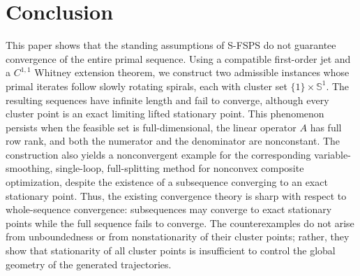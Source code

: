 \documentclass[11pt]{article}
\numberwithin{equation}{section}
\begin{document}
\section{Conclusion}\label{sec:conclusion}


This paper shows that the standing assumptions of S-FSPS do not
guarantee convergence of the entire primal sequence. Using a
compatible first-order jet and a $C^{1,1}$ Whitney extension theorem,
we construct two admissible instances whose primal iterates follow
slowly rotating spirals, each with cluster set
$\{1\}\times\mathbb S^1$. The resulting sequences have infinite
length and fail to converge, although every cluster point is an exact
limiting lifted stationary point.  This phenomenon persists when the feasible set is
full-dimensional, the linear operator  $A$ has full row rank,
and both the numerator and the denominator are nonconstant. The construction
also yields a nonconvergent example for the corresponding variable-smoothing,
single-loop, full-splitting method for  nonconvex composite optimization,
despite the existence of a subsequence converging to an exact stationary
point. Thus, the existing convergence theory is sharp with respect to
whole-sequence convergence: subsequences may converge to exact stationary
points while the full sequence fails to converge. The counterexamples do not arise from unboundedness or from
nonstationarity of their cluster points; rather, they show that
stationarity of all cluster points is insufficient to control the
global geometry of the generated trajectories.




\end{document}
